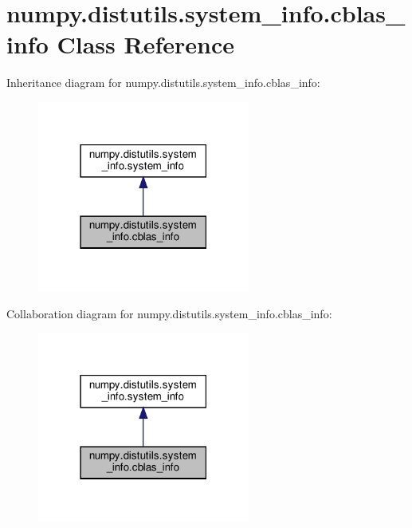 \hypertarget{classnumpy_1_1distutils_1_1system__info_1_1cblas__info}{}\section{numpy.\+distutils.\+system\+\_\+info.\+cblas\+\_\+info Class Reference}
\label{classnumpy_1_1distutils_1_1system__info_1_1cblas__info}


Inheritance diagram for numpy.\+distutils.\+system\+\_\+info.\+cblas\+\_\+info\+:
\nopagebreak
\begin{figure}[H]
\begin{center}
\leavevmode
\includegraphics[width=198pt]{classnumpy_1_1distutils_1_1system__info_1_1cblas__info__inherit__graph}
\end{center}
\end{figure}


Collaboration diagram for numpy.\+distutils.\+system\+\_\+info.\+cblas\+\_\+info\+:
\nopagebreak
\begin{figure}[H]
\begin{center}
\leavevmode
\includegraphics[width=198pt]{classnumpy_1_1distutils_1_1system__info_1_1cblas__info__coll__graph}
\end{center}
\end{figure}
